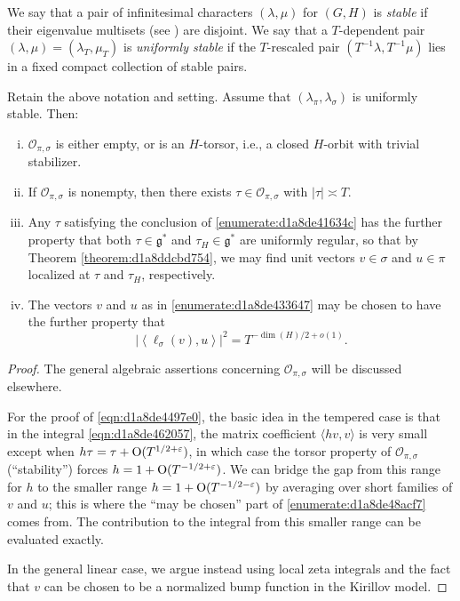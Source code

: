 \documentclass[reqno]{amsart} 
\numberwithin{equation}{section}
\numberwithin{theorem}{section}
\begin{document}
\begin{definition}
  We say that a pair of infinitesimal characters $(\lambda,\mu)$ for $(G,H)$ is \emph{stable} if their eigenvalue multisets (see \cite[\S13.4.1]{nelson-venkatesh-1}) are disjoint.  We say that a $T$-dependent pair $(\lambda,\mu) = (\lambda_T, \mu_T)$ is \emph{uniformly stable} if the $T$-rescaled pair $(T^{-1} \lambda, T^{-1} \mu)$ lies in a fixed compact collection of stable pairs.
\end{definition}

\begin{theorem}
  Retain the above notation and setting.  Assume that $(\lambda_\pi, \lambda_\sigma)$ is uniformly stable.  Then:
  \begin{enumerate}[(i)]
  \item $\mathcal{O}_{\pi,\sigma}$ is either empty, or is an $H$-torsor, i.e., a closed $H$-orbit with trivial stabilizer.
  \item\label{enumerate:d1a8de41634c} If $\mathcal{O}_{\pi,\sigma}$ is nonempty, then there exists $\tau \in \mathcal{O}_{\pi,\sigma}$ with $\lvert \tau \rvert \asymp T$.
  \item\label{enumerate:d1a8de433647} Any $\tau$ satisfying the conclusion of \eqref{enumerate:d1a8de41634c} has the further property that both $\tau \in \mathfrak{g}^*$ and $\tau_H \in \mathfrak{g}^*$ are uniformly regular, so that by Theorem \ref{theorem:d1a8ddcbd754}, we may find unit vectors $v \in \sigma$ and $u \in \pi$ localized at $\tau$ and $\tau_H$, respectively.
  \item\label{enumerate:d1a8de48acf7} The vectors $v$ and $u$ as in \eqref{enumerate:d1a8de433647} may be chosen to have the further property that
\begin{equation}\label{eqn:d1a8de4497e0}
\left\lvert \left\langle \ell_\sigma(v), u \right\rangle \right\rvert^2 = T^{-\dim(H)/2 + o(1)}.
\end{equation}    
  \end{enumerate}
\end{theorem}
\begin{proof}
  The general algebraic assertions concerning $\mathcal{O}_{\pi,\sigma}$ will be discussed elsewhere.

  For the proof of \eqref{eqn:d1a8de4497e0}, the basic idea in the tempered case is that in the integral \eqref{eqn:d1a8de462057}, the matrix coefficient $\langle h v, v \rangle$ is very small except when $h \tau = \tau + \operatorname{O}(T^{1/2+\varepsilon})$, in which case the torsor property of $\mathcal{O}_{\pi,\sigma}$ (``stability'') forces $h = 1 + \operatorname{O}(T^{-1/2+\varepsilon})$.  We can bridge the gap from this range for $h$ to the smaller range $h = 1 + \operatorname{O}(T^{-1/2-\varepsilon})$ by averaging over short families of $v$ and $u$; this is where the ``may be chosen'' part of \eqref{enumerate:d1a8de48acf7} comes from.  The contribution to the integral from this smaller range can be evaluated exactly.

  In the general linear case, we argue instead using local zeta integrals and the fact that $v$ can be chosen to be a normalized bump function in the Kirillov model.
\end{proof}





{} 
\end{document}
